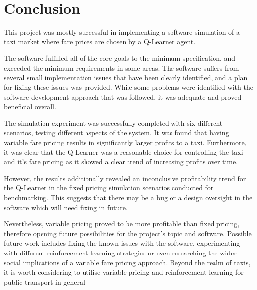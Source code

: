 \newpage
\section{Conclusion}
\label{sec:conclusion}

This project was mostly successful in implementing a software simulation of a
taxi market where fare prices are chosen by a Q-Learner agent. 

The software fulfilled all of the core goals to the minimum specification, and
exceeded the minimum requirements in some areas. The software suffers from
several small implementation issues that have been clearly identified, and a
plan for fixing these issues was provided. While some problems were identified
with the software development approach that was followed, it was adequate and
proved beneficial overall.

The simulation experiment was successfully completed with six different
scenarios, testing different aspects of the system. It was found that having
variable fare pricing results in significantly larger profits to a taxi.
Furthermore, it was clear that the Q-Learner was a reasonable choice for
controlling the taxi and it's fare pricing as it showed a clear trend of
increasing profits over time.

However, the results additionally revealed an inconclusive profitability trend
for the Q-Learner in the fixed pricing simulation scenarios conducted for
benchmarking. This suggests that there may be a bug or a design oversight in
the software which will need fixing in future.

Nevertheless, variable pricing proved to be more profitable than fixed pricing,
therefore opening future possibilities for the project's topic and software.
Possible future work includes fixing the known issues with the software,
experimenting with different reinforcement learning strategies or even
researching the wider social implications of a variable fare pricing approach.
Beyond the realm of taxis, it is worth considering to utilise variable pricing
and reinforcement learning for public transport in general.
